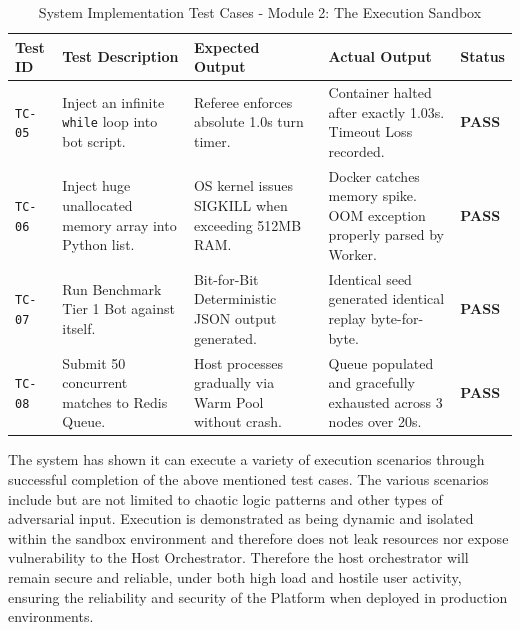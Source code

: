 \documentclass[12pt,a4paper]{report}
\begin{document}
\begin{table}[H]
\centering
\caption{System Implementation Test Cases - Module 2: The Execution Sandbox}
\label{tab:test_cases_sandbox}
\vspace{0.2cm}
\renewcommand{\arraystretch}{2.0}
\begin{tabular}{|p{1.5cm}|p{4.2cm}|p{3.8cm}|p{3.8cm}|p{1.4cm}|}
\hline
\textbf{Test ID} & \textbf{Test Description} & \textbf{Expected Output} & \textbf{Actual Output} & \textbf{Status} \\ \hline
\texttt{TC-05} & Inject an infinite \texttt{while} loop into bot script. & Referee enforces absolute 1.0s turn timer. & Container halted after exactly 1.03s. Timeout Loss recorded. & \textbf{PASS} \\ \hline
\texttt{TC-06} & Inject huge unallocated memory array into Python list. & OS kernel issues SIGKILL when exceeding 512MB RAM. & Docker catches memory spike. OOM exception properly parsed by Worker. & \textbf{PASS} \\ \hline
\texttt{TC-07} & Run Benchmark Tier 1 Bot against itself. & Bit-for-Bit Deterministic JSON output generated. & Identical seed generated identical replay byte-for-byte. & \textbf{PASS} \\ \hline
\texttt{TC-08} & Submit 50 concurrent matches to Redis Queue. & Host processes gradually via Warm Pool without crash. & Queue populated and gracefully exhausted across 3 nodes over 20s. & \textbf{PASS} \\ \hline
\end{tabular}
\end{table}
The system has shown it can execute a variety of execution scenarios through successful completion of the above mentioned test cases. The various scenarios include but are not limited to chaotic logic patterns and other types of adversarial input. Execution is demonstrated as being dynamic and isolated within the sandbox environment and therefore does not leak resources nor expose vulnerability to the Host Orchestrator. Therefore the host orchestrator will remain secure and reliable, under both high load and hostile user activity, ensuring the reliability and security of the Platform when deployed in production environments.

\end{document}
